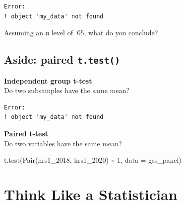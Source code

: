 \documentclass[
  letterpaper,
  DIV=11,
  numbers=noendperiod]{scrartcl}
\newenvironment{Shaded}{\begin{snugshade}}{\end{snugshade}}
\newcommand{\AttributeTok}[1]{\textcolor[rgb]{0.40,0.45,0.13}{#1}}
\newcommand{\DecValTok}[1]{\textcolor[rgb]{0.68,0.00,0.00}{#1}}
\newcommand{\FunctionTok}[1]{\textcolor[rgb]{0.28,0.35,0.67}{#1}}
\newcommand{\NormalTok}[1]{\textcolor[rgb]{0.00,0.23,0.31}{#1}}
\newcommand{\SpecialCharTok}[1]{\textcolor[rgb]{0.37,0.37,0.37}{#1}}
\newcommand{\StringTok}[1]{\textcolor[rgb]{0.13,0.47,0.30}{#1}}
\begin{document}
\begin{Shaded}
\end{Shaded}

\begin{verbatim}
Error:
! object 'my_data' not found
\end{verbatim}

Assuming an α level of .05, what do you conclude?

\subsection{\texorpdfstring{Aside: paired
\texttt{t.test()}}{Aside: paired t.test()}}\label{aside-paired-t.test}

\textbf{Independent group t-test}\\
Do two subsamples have the same mean?

\begin{Shaded}
\end{Shaded}

\begin{verbatim}
Error:
! object 'my_data' not found
\end{verbatim}

\textbf{Paired t-test}\\
Do two variables have the same mean?

\begin{Shaded}
\begin{Highlighting}[]
\FunctionTok{t.test}\NormalTok{(}\FunctionTok{Pair}\NormalTok{(hrs1\_2018, hrs1\_2020) }\SpecialCharTok{\textasciitilde{}} \DecValTok{1}\NormalTok{, }\AttributeTok{data =}\NormalTok{ gss\_panel)}
\end{Highlighting}
\end{Shaded}

\section{Think Like a Statistician}\label{think-like-a-statistician}
\end{document}

